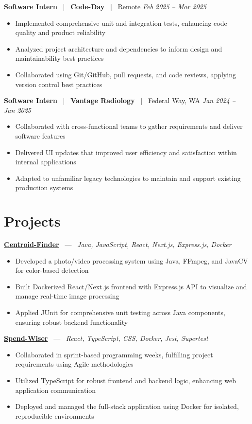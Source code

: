 \documentclass[10pt, letterpaper]{article}
\newcommand{\jobhead}[4]{%
  \vspace{5pt}%
  {\bfseries\color{dark}#1}%
  ~{\color{light}|}~%
  {\bfseries\color{navy}#2}%
  ~{\color{light}|}~%
  {\color{light}#3}%
  \hfill{\color{light}\small\textit{#4}}\\[-2pt]%
}
\newcommand{\projhead}[3]{%
  \vspace{5pt}%
  {\bfseries\color{dark}\href{#2}{#1}}%
  ~{\color{light}---}~%
  {\color{light}\small\textit{#3}}\\[-2pt]%
}
\begin{document}
\jobhead{Software Intern}{Code-Day}{Remote}{Feb 2025 – Mar 2025}
\begin{itemize}
  \item Implemented comprehensive unit and integration tests, enhancing code quality and product reliability
  \item Analyzed project architecture and dependencies to inform design and maintainability best practices
  \item Collaborated using Git/GitHub, pull requests, and code reviews, applying version control best practices
\end{itemize}

\jobhead{Software Intern}{Vantage Radiology}{Federal Way, WA}{Jan 2024 – Jan 2025}
\begin{itemize}
  \item Collaborated with cross-functional teams to gather requirements and deliver software features
  \item Delivered UI updates that improved user efficiency and satisfaction within internal applications
  \item Adapted to unfamiliar legacy technologies to maintain and support existing production systems
\end{itemize}

\section{Projects}

\projhead{Centroid-Finder}{https://github.com/xavierb117/centroid-finder}{Java, JavaScript, React, Next.js, Express.js, Docker}
\begin{itemize}
  \item Developed a photo/video processing system using Java, FFmpeg, and JavaCV for color-based detection
  \item Built Dockerized React/Next.js frontend with Express.js API to visualize and manage real-time image processing
  \item Applied JUnit for comprehensive unit testing across Java components, ensuring robust backend functionality
\end{itemize}

\projhead{Spend-Wiser}{https://github.com/JesseChum/w26-sdev372-spendwiser-finance-tracker}{React, TypeScript, CSS, Docker, Jest, Supertest}
\begin{itemize}
  \item Collaborated in sprint-based programming weeks, fulfilling project requirements using Agile methodologies
  \item Utilized TypeScript for robust frontend and backend logic, enhancing web application communication
  \item Deployed and managed the full-stack application using Docker for isolated, reproducible environments
\end{itemize}
\end{document}
